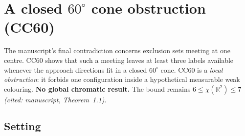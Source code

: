 \documentclass[11pt]{article}
\theoremstyle{definition}
\theoremstyle{remark}
\begin{document}
%

\section{A closed $60^\circ$ cone obstruction (CC60)}
\label{sec:cc60}

The manuscript's final contradiction concerns exclusion sets meeting at one
centre. CC60 shows that such a meeting leaves at least three labels
available whenever the approach directions fit in a closed $60^\circ$
cone. CC60 is a \emph{local obstruction}: it
forbids one configuration inside a hypothetical measurable weak colouring.
\textbf{No global chromatic result.} The bound remains
$6\le\chi(\mathbb R^2)\le7$ \emph{(cited: manuscript, Theorem~1.1)}.

\subsection{Setting}
\end{document}
